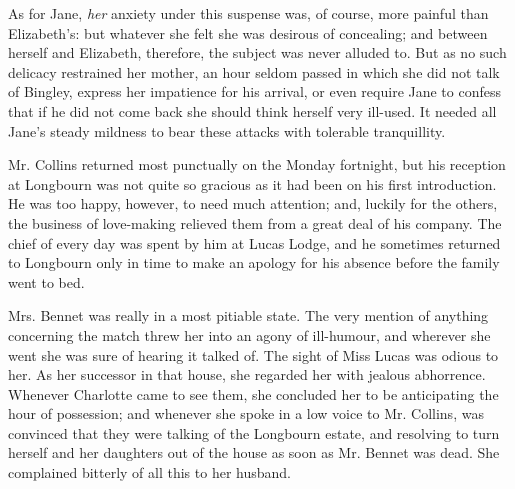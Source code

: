 As for Jane, \textit{her} anxiety under this suspense was, of course, more painful than Elizabeth's: but whatever she felt she was desirous of concealing; and between herself and Elizabeth, therefore, the subject was never alluded to. But as no such delicacy restrained her mother, an hour seldom passed in which she did not talk of Bingley, express her impatience for his arrival, or even require Jane to confess that if he did not come back she should think herself very ill-used. It needed all Jane's steady mildness to bear these attacks with tolerable tranquillity.

Mr. Collins returned most punctually on the Monday fortnight, but his reception at Longbourn was not quite so gracious as it had been on his first introduction. He was too happy, however, to need much attention; and, luckily for the others, the business of love-making relieved them from a great deal of his company. The chief of every day was spent by him at Lucas Lodge, and he sometimes returned to Longbourn only in time to make an apology for his absence before the family went to bed.




Mrs. Bennet was really in a most pitiable state. The very mention of anything concerning the match threw her into an agony of ill-humour, and wherever she went she was sure of hearing it talked of. The sight of Miss Lucas was odious to her. As her successor in that house, she regarded her with jealous abhorrence. Whenever Charlotte came to see them, she concluded her to be anticipating the hour of possession; and whenever she spoke in a low voice to Mr. Collins, was convinced that they were talking of the Longbourn estate, and resolving to turn herself and her daughters out of the house as soon as Mr. Bennet was dead. She complained bitterly of all this to her husband.

